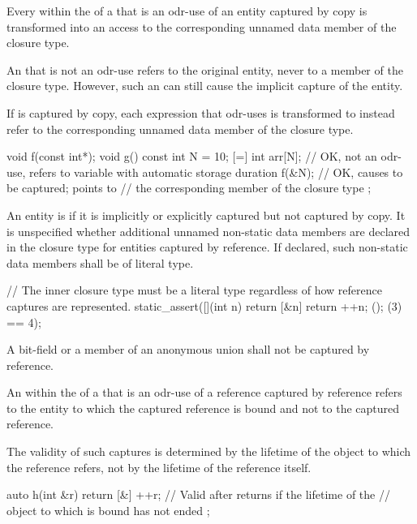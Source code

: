 \pnum
Every  within the  of a
 that is an odr-use of an
entity captured by copy is transformed into an access to the corresponding unnamed data
member of the closure type.
\begin{note}
An  that is not an odr-use refers to
the original entity, never to a member of the closure type.
However, such
an  can still cause the implicit capture of the
entity.
\end{note}
If  is captured by copy, each expression that odr-uses  is
transformed to instead refer to the corresponding unnamed data member of the closure type.
\begin{example}
\begin{codeblock}
void f(const int*);
void g() {
  const int N = 10;
  [=] {
    int arr[N];     // OK, not an odr-use, refers to variable with automatic storage duration
    f(&N);          // OK, causes  to be captured;  points to
                    // the corresponding member of the closure type
  };
}
\end{codeblock}
\end{example}

\pnum
An entity is  if it is implicitly or explicitly
captured but not captured by copy. It is unspecified whether additional unnamed
non-static data members are declared in the closure type for entities captured by
reference.
If declared, such non-static data members shall be of literal type.
\begin{example}
\begin{codeblock}
// The inner closure type must be a literal type regardless of how reference captures are represented.
static_assert([](int n) { return [&n] { return ++n; }(); }(3) == 4);
\end{codeblock}
\end{example}
A bit-field or a member of an anonymous union
shall not be captured by reference.

\pnum
An  within
the  of a 
that is an odr-use of a reference captured by reference
refers to the entity to which the captured reference is bound and
not to the captured reference.
\begin{note}
The validity of such captures is determined by
the lifetime of the object to which the reference refers,
not by the lifetime of the reference itself.
\end{note}
\begin{example}
\begin{codeblock}
auto h(int &r) {
  return [&] {
    ++r;            // Valid after  returns if the lifetime of the
                    // object to which  is bound has not ended
  };
}
\end{codeblock}
\end{example}

